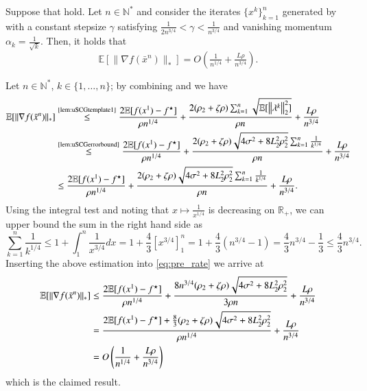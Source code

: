 \begin{lemmarep}
    Suppose that  hold. Let $n\in\mathbb{N}^*$ and consider the iterates $\{x^{k}\}_{k=1}^n$ generated by  with a constant stepsize $\gamma$ satisfying $\frac{1}{2n^{3/4}}<\gamma <\frac{1}{n^{3/4}}$ and vanishing momentum $\alpha_{k}=\tfrac{1}{\sqrt{k}}$. Then, it holds that
    \begin{equation*}
        \mathbb{E}[\|\nabla f(\bar{x}^n)\|_{\ast}] = O\left(\tfrac{1}{n^{1/4}} + \tfrac{L\rho}{n^{3/4}}\right).
    \end{equation*}
\end{lemmarep}
\begin{appendixproof}
    Let $n\in\mathbb{N}^*$, $k\in\{1,\ldots,n\}$; by combining  and  we have
    \begin{equation}\label{eq:pre_rate}
        \begin{aligned}
            \mathbb{E}[\|\nabla f(\bar{x}^n)\|_{\ast}]
                &\stackrel{\text{\eqref{lem:uSCGtemplate1}}}{\leq} \frac{2\mathbb{E}[f(x^1)-f^\star]}{\rho n^{1/4}} + \frac{2(\rho_2 + \zeta\rho)\sum_{k=1}^n\sqrt{\mathbb{E}[\left\Vert{\lambda^k}\right\Vert_2^2]}}{\rho n} + \frac{L\rho}{n^{3/4}}\\
                &\stackrel{\text{\eqref{lem:uSCGerrorbound}}}{\leq} \frac{2\mathbb{E}[f(x^1)-f^\star]}{\rho n^{1/4}} + \frac{2(\rho_2 + \zeta\rho)\sqrt{4\sigma^2+8L_2^2\rho_2^2}\sum_{k=1}^{n}\frac{1}{k^{1/4}}}{\rho n}  + \frac{L\rho}{n^{3/4}}\\
                &\leq \frac{2\mathbb{E}[f(x^1)-f^\star]}{\rho n^{1/4}} + \frac{2(\rho_2 + \zeta\rho)\sqrt{4\sigma^2+8L_2^2\rho_2^2}\sum_{k=1}^{n}\frac{1}{k^{1/4}}}{\rho n}  + \frac{L\rho}{n^{3/4}}.
        \end{aligned}
    \end{equation}
    Using the integral test and noting that $x\mapsto \tfrac{1}{x^{1/4}}$ is decreasing on $\mathbb{R}_+$, we can upper bound the sum in the right hand side as
    \begin{equation*}
        \sum_{k=1}^{n}\frac{1}{k^{1/4}}\leq 1 + \int_{1}^{n}\frac{1}{x^{3/4}}dx=1+\frac{4}{3}[x^{3/4}]^{n}_1=1+\frac{4}{3}(n^{3/4}-1) = \frac{4}{3}n^{3/4}-\frac{1}{3}\leq \frac{4}{3}n^{3/4}.
    \end{equation*}
    Inserting the above estimation into \eqref{eq:pre_rate} we arrive at
    \begin{align*}
        \mathbb{E}[\|\nabla f(\bar{x}^n)\|_{\ast}] &\leq \frac{2\mathbb{E}[f(x^1)-f^\star]}{\rho n^{1/4}}+ \frac{8 n^{3/4}(\rho_2 + \zeta\rho)\sqrt{4\sigma^2+8L_2^2\rho_2^2}}{3\rho n}  + \frac{L\rho}{n^{3/4}}\\
        &= \frac{2\mathbb{E}[f(x^1)-f^\star]+ \tfrac{8}{3}(\rho_2 + \zeta\rho)\sqrt{4\sigma^2+8L_2^2\rho_2^2}}{\rho n^{1/4}} + \frac{L\rho}{n^{3/4}}\\
        &= O\left(\frac{1}{n^{1/4}}+\frac{L\rho}{n^{3/4}}\right)
    \end{align*}
    which is the claimed result.
\end{appendixproof}

